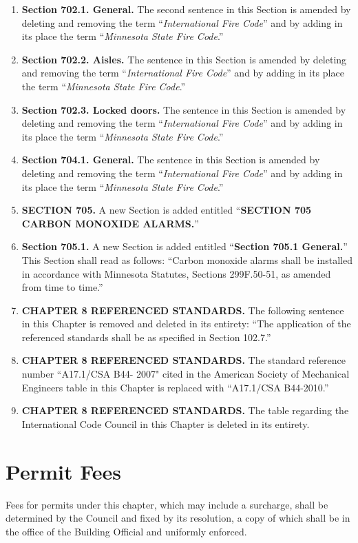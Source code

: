 \begin{enumerate}[{\indent}1)]
    \item \textbf{Section 702.1. General.} The second sentence in this Section is amended by deleting and removing the term “\textit{International Fire Code}” and by adding in its place the term “\textit{Minnesota State Fire Code}.”
    \item \textbf{Section 702.2. Aisles.} The sentence in this Section is amended by deleting and removing the term “\textit{International Fire Code}” and by adding in its place the term “\textit{Minnesota State Fire Code}.”
    \item \textbf{Section 702.3. Locked doors.} The sentence in this Section is amended by deleting and removing the term “\textit{International Fire Code}” and by adding in its place the term “\textit{Minnesota State Fire Code}.”
    \item \textbf{Section 704.1. General.} The sentence in this Section is amended by deleting and removing the term “\textit{International Fire Code}” and by adding in its place the term “\textit{Minnesota State Fire Code}.”
    \item \textbf{SECTION 705.} A new Section is added entitled “\textbf{SECTION 705 CARBON MONOXIDE ALARMS.}”
    \item \textbf{Section 705.1.} A new Section is added entitled “\textbf{Section 705.1 General.}” This Section shall read as follows: “Carbon monoxide alarms shall be installed in accordance with Minnesota Statutes, Sections 299F.50-51, as amended from time to time.”
    \item \textbf{CHAPTER 8 REFERENCED STANDARDS.} The following sentence in this Chapter is removed and deleted in its entirety: “The application of the referenced standards shall be as specified in Section 102.7.”
    \item \textbf{CHAPTER 8 REFERENCED STANDARDS.} The standard reference number “A17.1/CSA B44- 2007" cited in the American Society of Mechanical Engineers table in this Chapter is replaced with “A17.1/CSA B44-2010.”
    \item \textbf{CHAPTER 8 REFERENCED STANDARDS.} The table regarding the International Code Council in this Chapter is deleted in its entirety.
\end{enumerate}

\section{Permit Fees}
Fees for permits under this chapter, which may include a surcharge, shall be determined by the Council and fixed by its resolution, a copy of which shall be in the office of the Building Official and uniformly enforced.

